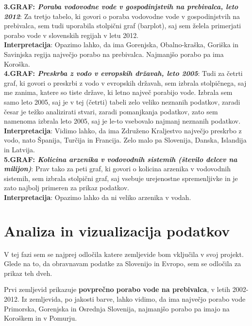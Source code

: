 \documentclass[11pt,a4paper]{article}
\begin{document}
\textbf{3.GRAF: \emph{Poraba vodovodne vode v gospodinjstvih na prebivalca, leto 2012}}: Za tretjo tabelo, ki govori o poraba vodovodne vode v gospodinjstvih na prebivalca, sem tudi uporabila stolpični graf (barplot), saj sem želela primerjati porabo vode v slovenskih regijah v letu 2012. \\
\textbf{Interpretacija}: Opazimo lahko, da ima Gorenjska, Obalno-kraška, Goriška in Savinjska regija največjo porabo na prebivalca. Najmanjšo porabo pa ima Koroška.\\

\textbf{4.GRAF: \emph{Preskrba z vodo v evropskih državah, leto 2005}}: Tudi za četrti graf, ki govori o preskrbi z vodo v evropskih državah, sem izbrala stolpičnega, saj me zanima, katere so tiste države, ki letno največ porabijo vode. Izbrala sem samo leto 2005, saj je v tej (četrti) tabeli zelo veliko neznanih podatkov, zaradi česar je težko analizirati stvari, zaradi pomanjkanja podatkov, zato sem namenoma izbrala leto 2005, saj je le-to vsebovalo najmanj neznanih podatkov.\\
\textbf{Interpretacija}: Vidimo lahko, da ima Združeno Kraljestvo največjo preskrbo z vodo, nato Španija, Turčija in Francija. Zelo malo pa Slovenija, Danska, Islandija in Latvija.\\

\textbf{5.GRAF: \emph{Kolicina arzenika v vodovodnih sistemih (število delcev na milijon)}}: Prav tako za peti graf, ki govori o kolicina arzenika v vodovodnih sistemih, sem izbrala stolpični graf, saj vsebuje urejenostne spremenljivke in je zato najbolj primeren za prikaz podatkov.\\
\textbf{Interpretacija}: Opazimo lahko da ni veliko arzenika v vodah.



\section{Analiza in vizualizacija podatkov}

V tej fazi sem se najprej odločila katere zemljevide bom vključila v svoj projekt. Glede na to, da obravnavam podatke za Slovenijo in Evropo, sem se odločila za prikaz teh dveh.
\vspace{5mm} 

Prvi zemljevid prikazuje \textbf{povprečno porabo vode na prebivalca}, v letih 2002-2012. Iz zemljevida, po jakosti barve, lahko vidimo, da ima največjo porabo vode Primorska, Gorenjska in Osrednja Slovenija, najmanjšo porabo pa imajo na Koroškem in v Pomurju.
\end{document}

